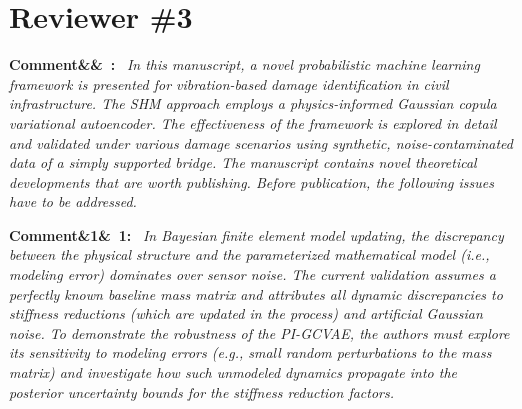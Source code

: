 \documentclass[11pt]{article}
\newenvironment{rcomment}[1]{\par\bigskip\noindent\textbf{Comment\ifx&#1&\else\ #1\fi:}\ \itshape}{\par}
\begin{document}
\section{Reviewer \#3}

\begin{rcomment}{}
In this manuscript, a novel probabilistic machine learning framework is presented for vibration-based damage
identification in civil infrastructure. The SHM approach employs a physics-informed Gaussian copula variational
autoencoder. The effectiveness of the framework is explored in detail and validated under various damage scenarios
using synthetic, noise-contaminated data of a simply supported bridge. The manuscript contains novel theoretical
developments that are worth publishing. Before publication, the following issues have to be addressed.
\end{rcomment}


\begin{rcomment}{1}
In Bayesian finite element model updating, the discrepancy between the physical structure and the parameterized
mathematical model (i.e., modeling error) dominates over sensor noise. The current validation assumes a perfectly known
baseline mass matrix and attributes all dynamic discrepancies to stiffness reductions (which are updated in the process)
and artificial Gaussian noise. To demonstrate the robustness of the PI-GCVAE, the authors must explore its sensitivity
to modeling errors (e.g., small random perturbations to the mass matrix) and investigate how such unmodeled dynamics
propagate into the posterior uncertainty bounds for the stiffness reduction factors.
\end{rcomment}
\end{document}
